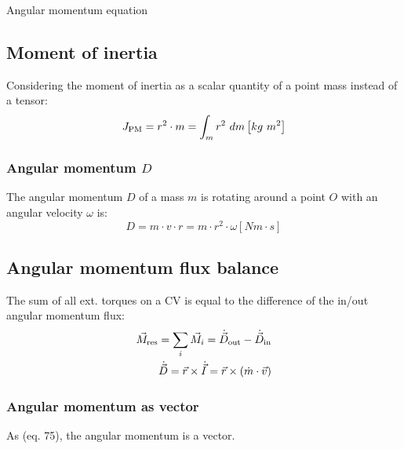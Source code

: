 \documentclass{article}
\begin{document}
\begin{multicols}{2}
\begin{theorybox}{Angular momentum equation}
    \subsection{Moment of inertia}
    Considering the moment of inertia as a scalar quantity of a point mass
    instead of a tensor:
    \begin{equation}
        J_{\rm PM} = r^2\cdot m = \int_m r^2\ dm \left[kg\ m^2\right]
    \end{equation}

    \subsubsection{Angular momentum $D$}
    The angular momentum $D$ of a mass $m$ is rotating around a point $O$ with an
    angular velocity $\omega$ is:
    \begin{equation}
        D = m\cdot v\cdot r = m\cdot r^2 \cdot \omega \left[Nm\cdot s\right]
    \end{equation}

    \subsection{Angular momentum flux balance}
    The sum of all ext. torques on a CV is equal
    to the difference of the in/out angular momentum flux:
    \vspace*{-0.3cm}
    \begin{align}
        \vec{M}_{\rm res} = \sum_i \vec{M}_i = \dot{\vec{D}}_{\rm out} - \dot{\vec{D}}_{\rm in}\\
        \dot{\vec{D}} = \vec{r} \times \dot{\vec{I}} = \vec{r} \times \left(\dot{m}\cdot \vec{v}\right)
    \end{align}

    \subsubsection{Angular momentum as vector}
    As (eq. 75), the angular momentum is a vector.
\end{theorybox}
\vfill
\columnbreak


\end{multicols}
\end{document}
